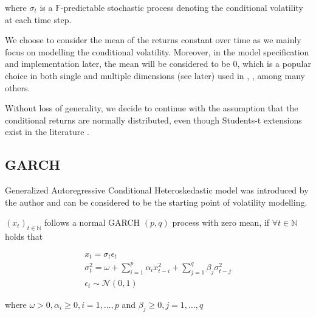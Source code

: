 \documentclass[a4paper, oneside]{discothesis}
\begin{document}
where $\sigma_t$ is a $\mathbb{F}$-predictable stochastic process denoting the conditional volatility at each time step.




  \begin{mdframed}\begin{remark}
We choose to consider the mean of the returns constant over time as we mainly focus on modelling the conditional volatility. Moreover, in the model specification and implementation later, the mean will be considered to be $0$, which is a popular choice in both single and multiple dimensions (see later) used in \cite{boulet}, \cite{fgd}, \cite{engle-multidimensions} among many others.
\end{remark}\end{mdframed}  

  \begin{mdframed}\begin{remark}
Without loss of generality, we decide to continue with the assumption that the conditional returns are normally distributed, even though Students-t extensions exist in the literature \cite{garch-t}.
\end{remark}\end{mdframed}  


\subsection{GARCH}

Generalized Autoregressive Conditional Heteroskedastic model was introduced by the author \cite{garch} and can be considered to be the starting point of volatility modelling.

\begin{definition}\label{thm:garch_def}

$\left(x_t\right)_{t\in \mathbb{N}}$ follows a normal GARCH $\left(p, q\right)$ process with zero mean, if $\forall t \in \mathbb{N}$ holds that

\begin{gather*}\label{eq:1}
x_t = \sigma_t \epsilon_t \\
\sigma^2_t = \omega + \sum_{i=1}^p\alpha_i x_{t-i}^2 + \sum_{j=1}^q \beta_j 
\sigma_{t-j}^2  \\
\epsilon_t \sim \mathcal{N}\left(0,1\right)
\end{gather*}

\end{definition}
where $\omega > 0, \alpha_i \geq 0, i = 1,\dots,p$ and $\beta_j \geq 0, j = 1,\dots,q$
\end{document}
